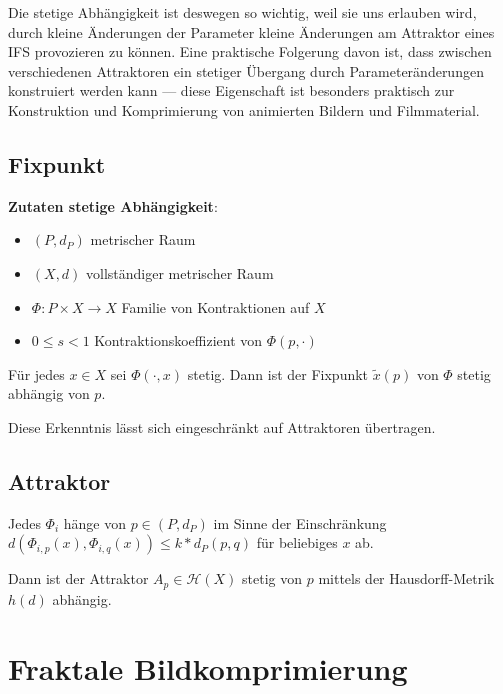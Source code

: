 \documentclass[afourpaper]{latex-classes/handout}
\begin{document}
\begin{marginfigure}
  Die stetige Abhängigkeit ist deswegen so wichtig, weil sie uns erlauben wird, durch kleine Änderungen der Parameter kleine Änderungen am Attraktor eines IFS provozieren zu können. Eine praktische Folgerung davon ist, dass zwischen verschiedenen Attraktoren ein stetiger Übergang durch Parameteränderungen konstruiert werden kann --- diese Eigenschaft ist besonders praktisch zur Konstruktion und Komprimierung von animierten Bildern und Filmmaterial.
\end{marginfigure}

\subsection{Fixpunkt}

\begin{marginfigure}
  \textbf{Zutaten stetige Abhängigkeit}:
  \begin{itemize}
    \item \( (P, d_P) \) metrischer Raum
    \item \( (X,d) \) vollständiger metrischer Raum
    \item \( \Phi: P \times X \to X \) Familie von Kontraktionen auf \( X \)
    \item \( 0 \leq s < 1 \) Kontraktionskoeffizient von \( \Phi(p, \cdot) \)
  \end{itemize}
\end{marginfigure}

Für jedes \( x \in X \) sei \( \Phi(\cdot, x) \) stetig. Dann ist der Fixpunkt \( \widetilde{x}(p) \) von \( \Phi \) stetig abhängig von \( p \).

Diese Erkenntnis lässt sich eingeschränkt auf Attraktoren übertragen.

\subsection{Attraktor}

Jedes \( \Phi_i \) hänge von \( p \in (P, d_P) \) im Sinne der Einschränkung \( d(\Phi_{i,p}(x), \Phi_{i,q}(x)) \leq k * d_P(p,q) \) für beliebiges \( x \) ab.

Dann ist der Attraktor \( A_p \in \mathcal{H}(X) \) stetig von \( p \) mittels der Hausdorff-Metrik \( h(d) \) abhängig.

\section{Fraktale Bildkomprimierung}
\end{document}
